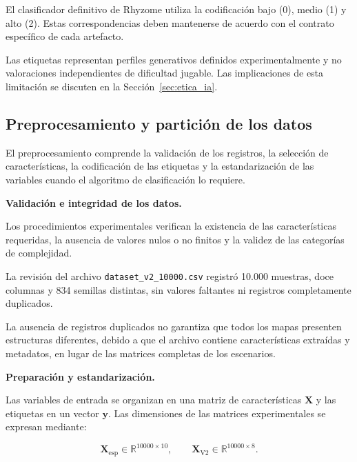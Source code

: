 El clasificador definitivo de Rhyzome utiliza la codificación bajo (0), medio (1) y alto (2). Estas correspondencias deben mantenerse de acuerdo con el contrato específico de cada artefacto.

Las etiquetas representan perfiles generativos definidos experimentalmente y no valoraciones independientes de dificultad jugable. Las implicaciones de esta limitación se discuten en la Sección~\ref{sec:etica_ia}.


\subsection{Preprocesamiento y partición de los datos}
\label{subsec:preprocesamiento_dataset}

El preprocesamiento comprende la validación de los registros, la selección de características, la codificación de las etiquetas y la estandarización de las variables cuando el algoritmo de clasificación lo requiere.

\textbf{Validación e integridad de los datos.}

Los procedimientos experimentales verifican la existencia de las características requeridas, la ausencia de valores nulos o no finitos y la validez de las categorías de complejidad.

La revisión del archivo
\texttt{dataset\_v2\_10000.csv} registró 10.000 muestras, doce columnas y 834 semillas distintas, sin valores faltantes ni registros completamente duplicados.

La ausencia de registros duplicados no garantiza que todos los mapas presenten estructuras diferentes, debido a que el archivo contiene características extraídas y metadatos, en lugar de las matrices completas de los escenarios.

\textbf{Preparación y estandarización.}

Las variables de entrada se organizan en una matriz de características $\mathbf{X}$ y las etiquetas en un vector $\mathbf{y}$. Las dimensiones de las matrices experimentales se expresan mediante:

\begin{equation}
	\mathbf{X}_{\mathrm{esp}}
	\in \mathbb{R}^{10000 \times 10},
	\qquad
	\mathbf{X}_{\mathrm{V2}}
	\in \mathbb{R}^{10000 \times 8}.
	\label{eq:dimensiones_matrices_experimentales}
\end{equation}

